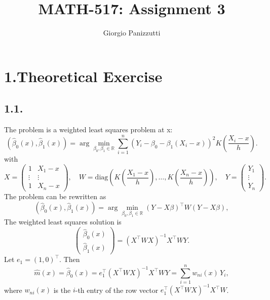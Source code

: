 \documentclass[11pt]{article}
\title{MATH-517: Assignment 3}
\author{Giorgio Panizzutti}
\date{}
\begin{document}
\maketitle


\section*{1.Theoretical Exercise}
\subsection*{1.1.}
The problem is a weighted least squares problem at x:
\[
(\hat\beta_0(x),\hat\beta_1(x))
=\arg\min_{\beta_0,\beta_1\in\mathbb{R}}
\sum_{i=1}^n \left(Y_i-\beta_0-\beta_1(X_i-x)\right)^2
K\left(\frac{X_i-x}{h}\right).
\]
with
\[
X=\begin{pmatrix}
1 & X_1-x\\
\vdots & \vdots\\
1 & X_n-x
\end{pmatrix},\quad
W=\mathrm{diag}(K\left(\frac{X_1-x}{h}\right),\ldots,K\left(\frac{X_n-x}{h}\right)),\quad
Y=\begin{pmatrix}Y_1\\ \vdots\\ Y_n\end{pmatrix}.
\]
The problem can be rewritten as
\[
(\hat\beta_0(x),\hat\beta_1(x))
=\arg\min_{\beta_0,\beta_1\in\mathbb{R}}
(Y-X\beta)^{\top}W(Y-X\beta),
\]
The weighted least squares solution is
\[
\begin{pmatrix}\hat\beta_0(x)\\ \hat\beta_1(x)\end{pmatrix}
=(X^{\top}WX)^{-1}X^{\top}WY.
\]
Let \(e_1=(1,0)^{\top}\). Then
\[
\hat m(x)=\hat\beta_0(x)=e_1^{\top}(X^{\top}WX)^{-1}X^{\top}WY
=\sum_{i=1}^n w_{ni}(x)\,Y_i,
\]
where \(w_{ni}(x)\) is the \(i\)-th entry of the row vector \(e_1^{\top}(X^{\top}WX)^{-1}X^{\top}W\).
\end{document}
